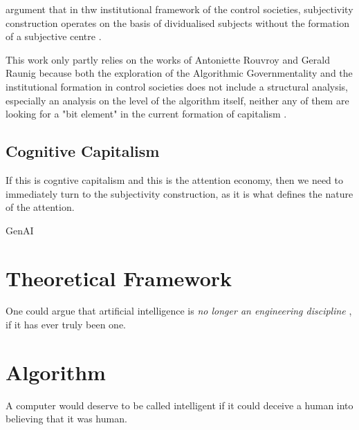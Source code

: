 \cite{mackenzie2021} argument that in thw institutional framework of the
control societies, subjectivity construction operates on the basis of
dividualised subjects without the formation of a subjective centre \parencite[14]{mackenzie2021}.

This work only partly relies on the works of Antoniette Rouvroy
and Gerald Raunig
because both the exploration of the Algorithmic Governmentality and the
institutional formation in control societies does not include a structural
analysis, especially an analysis on the level of the algorithm itself,
neither any of them are looking for a "bit element" in the current formation of
capitalism  .

%

\section{Cognitive Capitalism}
If this is cogntive capitalism and this is the attention economy, then we need
to immediately turn to the subjectivity construction, as it is what defines the
nature of the attention.

\gls{GenAI}

\chapter{Theoretical Framework}\label{chap:Theoretical Framework} %
One could argue that artificial intelligence is \emph{no longer an engineering
	discipline} \parencite[206]{dignum2020}, if it has ever truly been one.

\chapter{Algorithm}\label{chap:Algorithm} %
\epigraph{A computer would deserve to be called intelligent if it could deceive a human into believing that it was human.}{\textcite{turing1950}}


